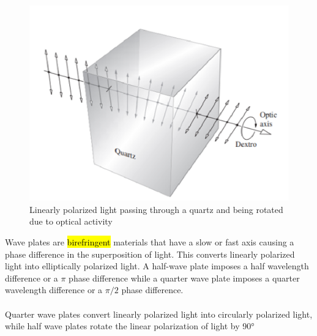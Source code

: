 \documentclass{article}
\begin{document}
\begin{figure}[!phbt]
    \centering
    \includegraphics[width=0.4\linewidth]{img/opticalactivity.eps}
    \caption{Linearly polarized light passing through a quartz and being rotated due to optical activity}
    \label{fig:opticalactivity}
\end{figure}

Wave plates are \hl{birefringent} materials that have a slow or fast axis causing a phase difference in the superposition of light. This converts linearly polarized light into elliptically polarized light. A half-wave plate imposes a half wavelength difference or a $\pi$ phase difference while a quarter wave plate imposes a quarter wavelength difference or a $\pi/2$ phase difference.
\\
\\
Quarter wave plates convert linearly polarized light into circularly polarized light, while half wave plates rotate the linear polarization of light by 90°
\end{document}
